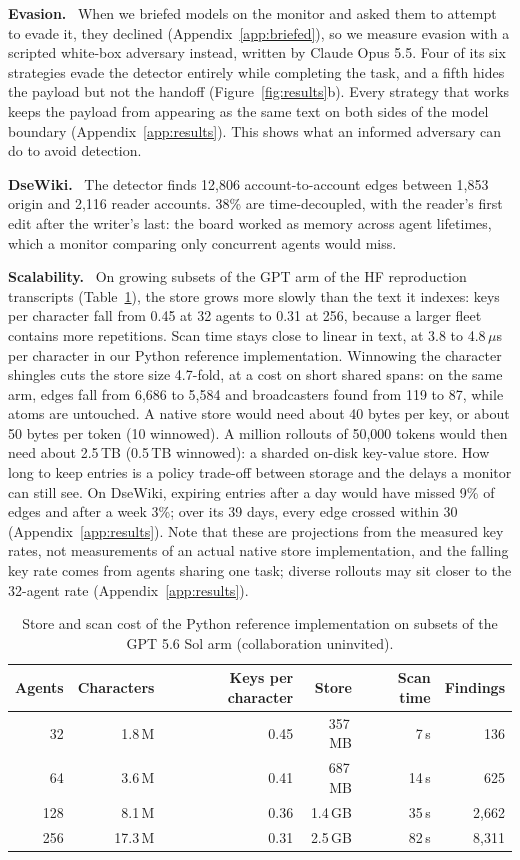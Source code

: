 \documentclass[11pt,a4paper]{article}
\newcommand{\lead}[1]{\textbf{#1}\ }
\begin{document}
\lead{Evasion.} When we briefed models on the monitor and asked them to attempt to evade it, they declined (Appendix~\ref{app:briefed}), so we measure evasion with a scripted white-box adversary instead, written by Claude Opus 5.5. Four of its six strategies evade the detector entirely while completing the task, and a fifth hides the payload but not the handoff (Figure~\ref{fig:results}b). Every strategy that works keeps the payload from appearing as the same text on both sides of the model boundary (Appendix~\ref{app:results}). This shows what an informed adversary can do to avoid detection.

\lead{DseWiki.} The detector finds 12,806 account-to-account edges between 1,853 origin and 2,116 reader accounts. 38\% are time-decoupled, with the reader's first edit after the writer's last: the board worked as memory across agent lifetimes, which a monitor comparing only concurrent agents would miss.

\lead{Scalability.} On growing subsets of the GPT arm of the HF reproduction transcripts (Table~\ref{tab:scale}), the store grows more slowly than the text it indexes: keys per character fall from 0.45 at 32 agents to 0.31 at 256, because a larger fleet contains more repetitions. Scan time stays close to linear in text, at 3.8 to 4.8\,$\mu$s per character in our Python reference implementation. Winnowing the character shingles \cite{schleimer2003} cuts the store size 4.7-fold, at a cost on short shared spans: on the same arm, edges fall from 6,686 to 5,584 and broadcasters found from 119 to 87, while atoms are untouched. A native store would need about 40 bytes per key, or about 50 bytes per token (10 winnowed). A million rollouts of 50,000 tokens would then need about 2.5\,TB (0.5\,TB winnowed): a sharded on-disk key-value store. How long to keep entries is a policy trade-off between storage and the delays a monitor can still see. On DseWiki, expiring entries after a day would have missed 9\% of edges and after a week 3\%; over its 39 days, every edge crossed within 30 (Appendix~\ref{app:results}). Note that these are projections from the measured key rates, not measurements of an actual native store implementation, and the falling key rate comes from agents sharing one task; diverse rollouts may sit closer to the 32-agent rate (Appendix~\ref{app:results}).

\begin{table}[t]
\centering\small
\caption{Store and scan cost of the Python reference implementation on subsets of the GPT 5.6 Sol arm (collaboration uninvited).}\label{tab:scale}
\begin{tabular}{rrrrrr}
\toprule
Agents & Characters & Keys per character & Store & Scan time & Findings \\
\midrule
32 & 1.8\,M & 0.45 & 357\,MB & 7\,s & 136 \\
64 & 3.6\,M & 0.41 & 687\,MB & 14\,s & 625 \\
128 & 8.1\,M & 0.36 & 1.4\,GB & 35\,s & 2,662 \\
256 & 17.3\,M & 0.31 & 2.5\,GB & 82\,s & 8,311 \\
\bottomrule
\end{tabular}
\end{table}
\end{document}
